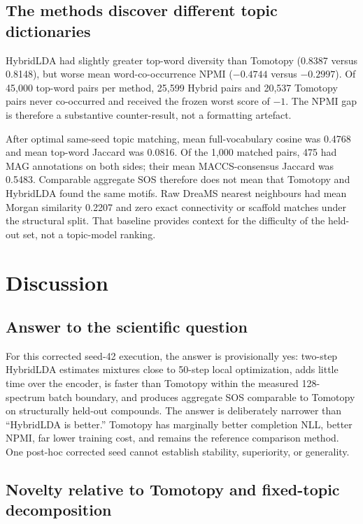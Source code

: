\documentclass[11pt]{article}
\begin{document}
\subsection{The methods discover different topic dictionaries}

HybridLDA had slightly greater top-word diversity than Tomotopy (0.8387 versus
0.8148), but worse mean word-co-occurrence NPMI ($-0.4744$ versus $-0.2997$).
Of 45,000 top-word pairs per method, 25,599 Hybrid pairs and 20,537 Tomotopy
pairs never co-occurred and received the frozen worst score of $-1$. The NPMI
gap is therefore a substantive counter-result, not a formatting artefact.

After optimal same-seed topic matching, mean full-vocabulary cosine was 0.4768
and mean top-word Jaccard was 0.0816. Of the 1,000 matched pairs, 475 had MAG
annotations on both sides; their mean MACCS-consensus Jaccard was 0.5483.
Comparable aggregate SOS therefore does not mean that Tomotopy and HybridLDA
found the same motifs. Raw DreaMS nearest neighbours had mean Morgan similarity
0.2207 and zero exact connectivity or scaffold matches under the structural
split. That baseline provides context for the difficulty of the held-out set,
not a topic-model ranking.

\section{Discussion}

\subsection{Answer to the scientific question}

For this corrected seed-42 execution, the answer is provisionally yes:
two-step HybridLDA estimates mixtures close to 50-step local optimization,
adds little time over the encoder, is faster than Tomotopy within the measured
128-spectrum batch boundary, and
produces aggregate SOS comparable to Tomotopy on structurally held-out
compounds. The answer is deliberately narrower than ``HybridLDA is better.''
Tomotopy has marginally better completion NLL, better NPMI, far lower training
cost, and remains the reference comparison method. One post-hoc corrected seed cannot
establish stability, superiority, or generality.

\subsection{Novelty relative to Tomotopy and fixed-topic decomposition}
\end{document}
